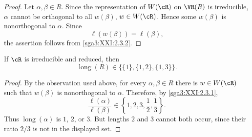 \begin{proof}
Let \(\alpha,\beta\in R\). Since the representation of \(W(\cR)\)
on \(\VR(R)\) is irreducible, \(\alpha\) cannot be orthogonal to
all \(w(\beta)\), \(w\in W(\cR)\). Hence some \(w(\beta)\) is
nonorthogonal to \(\alpha\). Since
\[
 \ell(w(\beta))=\ell(\beta),
\]
the assertion follows from \ref{sga3:XXI:2.3.2}.
\end{proof}

\begin{lemma}\label{sga3:XXI:7.2.3}
If \(\cR\) is irreducible and reduced, then
\[
 \operatorname{long}(R)
 \in\bigl\{\{1\},\{1,2\},\{1,3\}\bigr\}.
\]
\end{lemma}

\begin{proof}
By the observation used above, for every
\(\alpha,\beta\in R\) there is \(w\in W(\cR)\) such that
\(w(\beta)\) is nonorthogonal to \(\alpha\). Therefore, by
\ref{sga3:XXI:2.3.1},
\[
 \frac{\ell(\alpha)}{\ell(\beta)}
 \in\left\{1,2,3,\frac12,\frac13\right\}.
\]
Thus \(\operatorname{long}(\alpha)\) is \(1\), \(2\), or \(3\).
But lengths \(2\) and \(3\) cannot both occur, since their ratio
\(2/3\) is not in the displayed set.
\end{proof}
